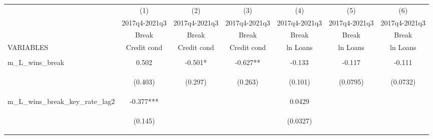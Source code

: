\documentclass[]{article}
\begin{document}
\begin{center}
\begin{tabular}{lcccccc} \hline
 & (1) & (2) & (3) & (4) & (5) & (6) \\
 & 2017q4-2021q3 & 2017q4-2021q3 & 2017q4-2021q3 & 2017q4-2021q3 & 2017q4-2021q3 & 2017q4-2021q3 \\
 & Break & Break & Break & Break & Break & Break \\
VARIABLES & Credit cond & Credit cond & Credit cond & ln Loans & ln Loans & ln Loans \\ \hline
\vspace{4pt} & \begin{footnotesize}\end{footnotesize} & \begin{footnotesize}\end{footnotesize} & \begin{footnotesize}\end{footnotesize} & \begin{footnotesize}\end{footnotesize} & \begin{footnotesize}\end{footnotesize} & \begin{footnotesize}\end{footnotesize} \\
m\_L\_wins\_break & 0.502 & -0.501* & -0.627** & -0.133 & -0.117 & -0.111 \\
\vspace{4pt} & \begin{footnotesize}(0.403)\end{footnotesize} & \begin{footnotesize}(0.297)\end{footnotesize} & \begin{footnotesize}(0.263)\end{footnotesize} & \begin{footnotesize}(0.101)\end{footnotesize} & \begin{footnotesize}(0.0795)\end{footnotesize} & \begin{footnotesize}(0.0732)\end{footnotesize} \\
m\_L\_wins\_break\_key\_rate\_lag2 & -0.377*** &  &  & 0.0429 &  &  \\
\vspace{4pt} & \begin{footnotesize}(0.145)\end{footnotesize} & \begin{footnotesize}\end{footnotesize} & \begin{footnotesize}\end{footnotesize} & \begin{footnotesize}(0.0327)\end{footnotesize} & \begin{footnotesize}\end{footnotesize} & \begin{footnotesize}\end{footnotesize} \\

\end{tabular}
\end{center}
\end{document}
